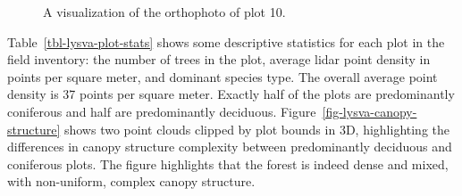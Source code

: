 \begin{figure}
\caption{\label{fig-example-ortho}A visualization of the orthophoto of
plot 10.}
\end{figure}

Table~\ref{tbl-lysva-plot-stats} shows some descriptive statistics for each plot in the field inventory: the number of trees in the plot, average \gls{lidar} point density in points per square meter, and dominant species type.
The overall average point density is 37 points per square meter.
Exactly half of the plots are predominantly coniferous and half are predominantly deciduous.
Figure~\ref{fig-lysva-canopy-structure} shows two point clouds clipped by plot bounds in 3D, highlighting the differences in canopy structure complexity between predominantly deciduous and coniferous plots.
The figure highlights that the forest is indeed dense and mixed, with non-uniform, complex canopy structure.

